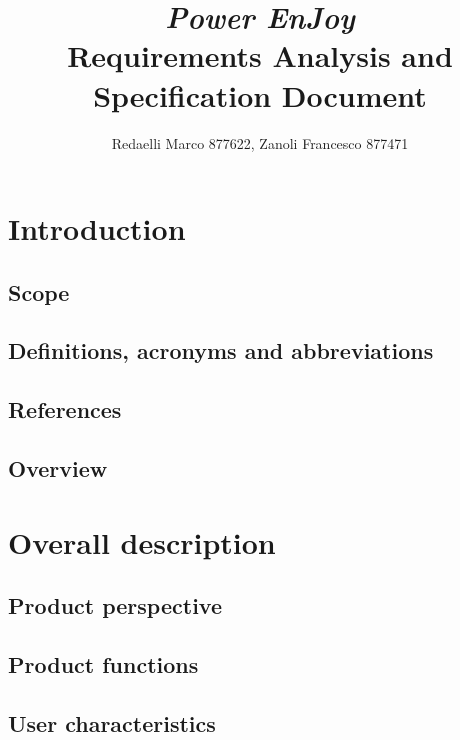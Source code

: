\documentclass[]{report}
\title{{\Huge\textit{Power EnJoy}}\\{\LARGE Requirements Analysis and Specification Document}}
\author{Redaelli Marco 877622, Zanoli Francesco 877471}
\begin{document}
\maketitle

\tableofcontents

\listoffigures
\chapter{Introduction}



\section{Scope}


\section{Definitions, acronyms and abbreviations}


\section{References}


\section{Overview}


\chapter{Overall description}

\section{Product perspective}


\section{Product functions}


\section{User characteristics}

\end{document}
